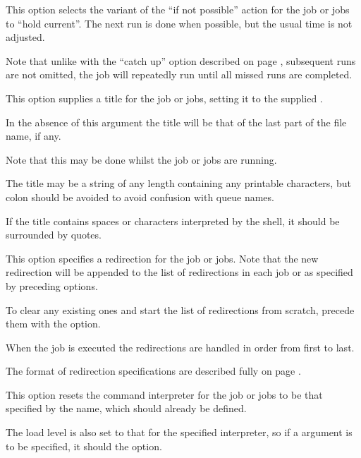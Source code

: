 
This option selects the variant of the ``if not possible'' action for the job or jobs to ``hold current''. The next run is done
when possible, but the usual time is not adjusted.

Note that unlike with the ``catch up'' option described on page \pageref{btjchange:catchup},
subsequent runs are not omitted, the job will repeatedly run until all missed runs are completed.


This option supplies a title for the job or jobs, setting it to the supplied .

In the absence of this argument the title will be that of the last part of the file name, if any.

Note that this may be done whilst the job or jobs are running.

The title may be a string of any length containing any printable characters, but colon should be avoided to avoid confusion with queue names.

If the title contains spaces or characters interpreted by the shell, it should be surrounded by quotes.


This option specifies a redirection for the job or jobs. Note that the new redirection will be appended to the list of redirections in each job or as specified by preceding  options.

To clear any existing ones and start the list of redirections from scratch, precede them with the 
option.

When the job is executed the redirections are handled in order from first to last.

The format of redirection specifications are described fully on page \pageref{btr:redirfmt}.


This option resets the command interpreter for the job or jobs to be that specified by the name, which should already be defined.

The load level is also set to that for the specified interpreter, so if a  argument is to be specified,
it should  the  option.


